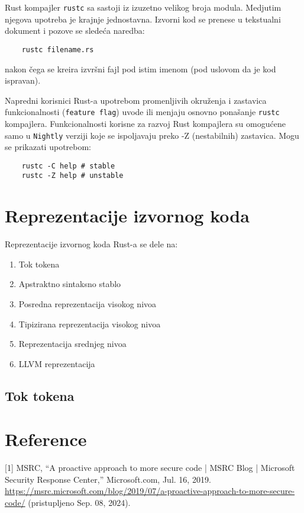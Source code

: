\documentclass{article}
\begin{document}
Rust kompajler \verb|rustc| sa sastoji iz izuzetno velikog broja modula. 
Medjutim njegova upotreba je krajnje jednostavna.
Izvorni kod se prenese u tekstualni dokument i pozove se sledeća naredba:
\begin{verbatim}
    rustc filename.rs
\end{verbatim}
nakon čega se kreira izvršni fajl pod istim imenom (pod uslovom da je kod ispravan).

Napredni korisnici Rust-a upotrebom promenljivih okruženja i zastavica funkcionalnosti 
(\verb|feature flag|) uvode ili menjaju osnovno ponašanje \verb|rustc| kompajlera.
Funkcionalnosti korisne za razvoj Rust kompajlera su omogućene samo u \verb|Nightly| verziji koje se
ispoljavaju preko -Z (nestabilnih) zastavica. Mogu se prikazati upotrebom:

\begin{verbatim}
    rustc -C help # stable
    rustc -Z help # unstable
\end{verbatim}


\section{Reprezentacije izvornog koda}

Reprezentacije izvornog koda Rust-a se dele na:

\begin{enumerate}    
    \item Tok tokena
    \item Apstraktno sintaksno stablo
    \item Posredna reprezentacija visokog nivoa
    \item Tipizirana reprezentacija visokog nivoa
    \item Reprezentacija srednjeg nivoa
    \item LLVM reprezentacija
\end{enumerate}


\subsection{Tok tokena}



\section{Reference}
[1] MSRC, “A proactive approach to more secure code | MSRC Blog | 
Microsoft Security Response Center,” Microsoft.com, Jul. 16, 2019. 
\url{https://msrc.microsoft.com/blog/2019/07/a-proactive-approach-to-more-secure-code/} 
(pristupljeno Sep. 08, 2024).
\end{document}
